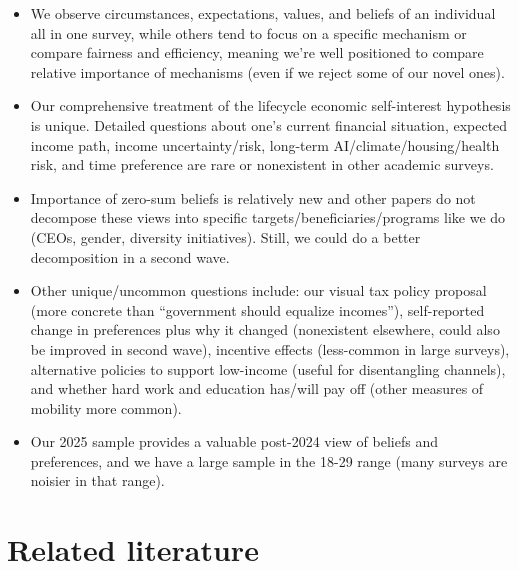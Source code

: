 \documentclass{article}
\begin{document}
\begin{itemize}
    \item We observe circumstances, expectations, values, and beliefs of an individual all in one survey, while others tend to focus on a specific mechanism or compare fairness and efficiency, meaning we're well positioned to compare relative importance of mechanisms (even if we reject some of our novel ones). 
    \item Our comprehensive treatment of the lifecycle economic self-interest hypothesis is unique. Detailed questions about one's current financial situation, expected income path, income uncertainty/risk, long-term AI/climate/housing/health risk, and time preference are rare or nonexistent in other academic surveys.
    \item Importance of zero-sum beliefs is relatively new and other papers do not decompose these views into specific targets/beneficiaries/programs like we do (CEOs, gender, diversity initiatives). Still, we could do a better decomposition in a second wave.
    \item Other unique/uncommon questions include: our visual tax policy proposal (more concrete than ``government should equalize incomes''), self-reported change in preferences plus why it changed (nonexistent elsewhere, could also be improved in second wave), incentive effects (less-common in large surveys), alternative policies to support low-income (useful for disentangling channels), and whether hard work and education has/will pay off (other measures of mobility more common).
    \item Our 2025 sample provides a valuable post-2024 view of beliefs and preferences, and we have a large sample in the 18-29 range (many surveys are noisier in that range).
\end{itemize}


\section{Related literature}
\end{document}
